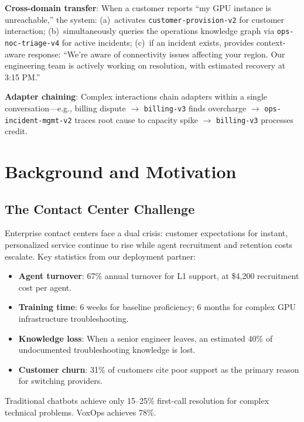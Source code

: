 \documentclass[conference,10pt]{IEEEtran}
\begin{document}
\textbf{Cross-domain transfer}: When a customer reports ``my GPU instance is unreachable,'' the system: (a)~activates \texttt{customer-provision-v2} for customer interaction; (b)~simultaneously queries the operations knowledge graph via \texttt{ops-noc-triage-v4} for active incidents; (c)~if an incident exists, provides context-aware response: ``We're aware of connectivity issues affecting your region. Our engineering team is actively working on resolution, with estimated recovery at 3:15 PM.''

\textbf{Adapter chaining}: Complex interactions chain adapters within a single conversation---e.g., billing dispute $\to$ \texttt{billing-v3} finds overcharge $\to$ \texttt{ops-incident-mgmt-v2} traces root cause to capacity spike $\to$ \texttt{billing-v3} processes credit.


\section{Background and Motivation}
\label{sec:background}

\subsection{The Contact Center Challenge}

Enterprise contact centers face a dual crisis: customer expectations for instant, personalized service continue to rise while agent recruitment and retention costs escalate. Key statistics from our deployment partner:

\begin{itemize}
\item \textbf{Agent turnover}: 67\% annual turnover for L1 support, at \$4,200 recruitment cost per agent.
\item \textbf{Training time}: 6 weeks for baseline proficiency; 6 months for complex GPU infrastructure troubleshooting.
\item \textbf{Knowledge loss}: When a senior engineer leaves, an estimated 40\% of undocumented troubleshooting knowledge is lost.
\item \textbf{Customer churn}: 31\% of customers cite poor support as the primary reason for switching providers.
\end{itemize}

Traditional chatbots achieve only 15--25\% first-call resolution for complex technical problems. VoxOps achieves 78\%.
\end{document}
